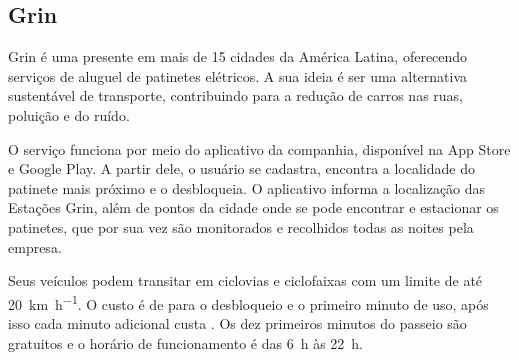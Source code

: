 \subsection{Grin}
\label{sec:grin}

Grin é uma  presente em mais de 15 cidades da América Latina, oferecendo serviços de aluguel de patinetes elétricos. A sua ideia é ser uma alternativa sustentável de transporte, contribuindo para a redução de carros nas ruas, poluição e do ruído.

O serviço funciona por meio do aplicativo da companhia, disponível na App Store e Google Play. A partir dele, o usuário se cadastra, encontra a localidade do patinete mais próximo e o desbloqueia. O aplicativo informa a localização das Estações Grin, além de pontos da cidade onde se pode encontrar e estacionar os patinetes, que por sua vez são monitorados e recolhidos todas as noites pela empresa.

Seus veículos podem transitar em ciclovias e ciclofaixas com um limite de até \SI{20}{\km\per\hour}. O custo é de  para o desbloqueio e o primeiro minuto de uso, após isso cada minuto adicional custa . Os dez primeiros minutos do passeio são gratuitos e o horário de funcionamento é das \SI{6}{\hour} às \SI{22}{\hour}.


